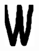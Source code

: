 \documentclass[russian,utf8,emptystyle]{eskdtext}
\begin{document}
\begin{figure}[!htb]
\includegraphics[width=\linewidth]{../data/learn/w/001}
\endminipage\hfill
{}

\end{figure}
\end{document}
